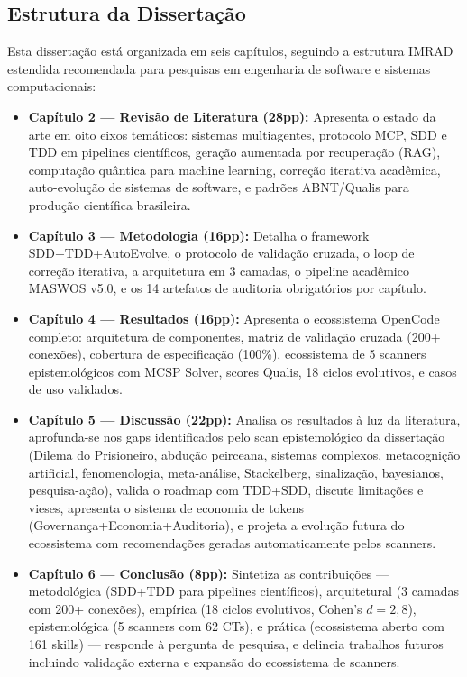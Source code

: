 \subsection{Estrutura da Dissertação}

Esta dissertação está organizada em seis capítulos, seguindo a estrutura IMRAD estendida recomendada para pesquisas em engenharia de software e sistemas computacionais:

\begin{itemize}
  \item \textbf{Capítulo 2 --- Revisão de Literatura (28pp):} Apresenta o estado da arte em oito eixos temáticos: sistemas multiagentes, protocolo MCP, SDD e TDD em pipelines científicos, geração aumentada por recuperação (RAG), computação quântica para machine learning, correção iterativa acadêmica, auto-evolução de sistemas de software, e padrões ABNT/Qualis para produção científica brasileira.

  \item \textbf{Capítulo 3 --- Metodologia (16pp):} Detalha o framework SDD+\-TDD+\-Auto\-Evolve, o protocolo de validação cruzada, o loop de correção iterativa, a arquitetura em 3 camadas, o pipeline acadêmico MASWOS v5.0, e os 14 artefatos de auditoria obrigatórios por capítulo.

  \item \textbf{Capítulo 4 --- Resultados (16pp):} Apresenta o ecossistema OpenCode completo: arquitetura de componentes, matriz de validação cruzada (200+ conexões), cobertura de especificação (100\%), ecossistema de 5 scanners epistemológicos com MCSP Solver, scores Qualis, 18 ciclos evolutivos, e casos de uso validados.

  \item \textbf{Capítulo 5 --- Discussão (22pp):} Analisa os resultados à luz da literatura, aprofunda-se nos gaps identificados pelo scan epistemológico da dissertação (Dilema do Prisioneiro, abdução peirceana, sistemas complexos, metacognição artificial, fenomenologia, meta-análise, Stackelberg, sinalização, bayesianos, pesquisa-ação), valida o roadmap com TDD+SDD, discute limitações e vieses, apresenta o sistema de economia de tokens (Governança+Economia+Auditoria), e projeta a evolução futura do ecossistema com recomendações geradas automaticamente pelos scanners.

  \item \textbf{Capítulo 6 --- Conclusão (8pp):} Sintetiza as contribuições --- metodológica (SDD+TDD para pipelines científicos), arquitetural (3 camadas com 200+ conexões), empírica (18 ciclos evolutivos, Cohen's $d = 2,8$), epistemológica (5 scanners com 62 CTs), e prática (ecossistema aberto com 161 skills) --- responde à pergunta de pesquisa, e delineia trabalhos futuros incluindo validação externa e expansão do ecossistema de scanners.
\end{itemize}

